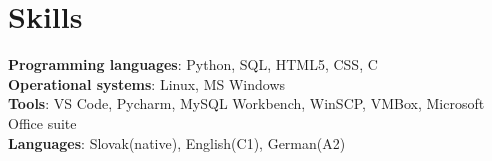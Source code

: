 \documentclass[letterpaper,11pt]{article}
\begin{document}
\section{Skills}
 \begin{itemize}[leftmargin=0.15in, label={}]
    \small{\item{   
     \textbf{Programming languages}{: Python, SQL, HTML5, CSS, C} \\[1mm]
     \textbf{Operational systems}{: Linux, MS Windows} \\[1mm]
	\textbf{Tools}{: VS Code, Pycharm, MySQL Workbench, WinSCP, VMBox, Microsoft Office suite}\\[1mm]
	\textbf{Languages}{: Slovak(native), English(C1), German(A2)} \\[1mm]
    }}
 \end{itemize}
 \vspace{-16pt}
 \vspace{1pt}
\vspace{10pt}
\end{document}
